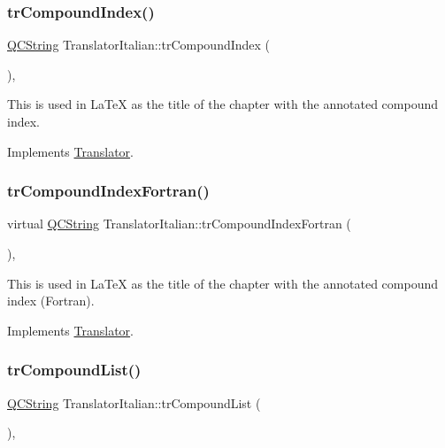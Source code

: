 \subsubsection{\texorpdfstring{trCompoundIndex()}{trCompoundIndex()}}
{\footnotesize\ttfamily \mbox{\hyperlink{class_q_c_string}{Q\+C\+String}} Translator\+Italian\+::tr\+Compound\+Index (\begin{DoxyParamCaption}{ }\end{DoxyParamCaption})\hspace{0.3cm}{\ttfamily [inline]}, {\ttfamily [virtual]}}

This is used in La\+TeX as the title of the chapter with the annotated compound index. 

Implements \mbox{\hyperlink{class_translator}{Translator}}.

\mbox{\label{class_translator_italian_a07e7bc2eeca3c972c0b39ec248adf59c}} 
\subsubsection{\texorpdfstring{trCompoundIndexFortran()}{trCompoundIndexFortran()}}
{\footnotesize\ttfamily virtual \mbox{\hyperlink{class_q_c_string}{Q\+C\+String}} Translator\+Italian\+::tr\+Compound\+Index\+Fortran (\begin{DoxyParamCaption}{ }\end{DoxyParamCaption})\hspace{0.3cm}{\ttfamily [inline]}, {\ttfamily [virtual]}}

This is used in La\+TeX as the title of the chapter with the annotated compound index (Fortran). 

Implements \mbox{\hyperlink{class_translator}{Translator}}.

\mbox{\label{class_translator_italian_a1a170cff07e299c220405d026896ff42}} 
\subsubsection{\texorpdfstring{trCompoundList()}{trCompoundList()}}
{\footnotesize\ttfamily \mbox{\hyperlink{class_q_c_string}{Q\+C\+String}} Translator\+Italian\+::tr\+Compound\+List (\begin{DoxyParamCaption}{ }\end{DoxyParamCaption})\hspace{0.3cm}{\ttfamily [inline]}, {\ttfamily [virtual]}}

